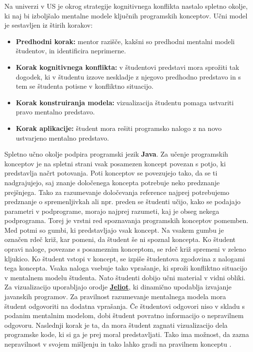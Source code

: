 
Na univerzi v US \cite{mentalModels} je okrog strategije kognitivnega
konflikta nastalo spletno okolje, ki naj bi izboljšalo mentalne modele
ključnih programskih konceptov. Učni model je sestavljen iz štirih
korakov:

\begin{itemize}
\item \textbf{Predhodni korak:} mentor razišče, kakšni so predhodni
 mentalni modeli študentov, in identificira neprimerne.
\item \textbf{Korak kognitivnega konflikta:} v študentovi predstavi
  mora sprožiti tak dogodek, ki v študentu izzove neskladje z njegovo
  predhodno predstavo in s tem se študenta potisne v konfliktno
  situacijo.
\item \textbf{Korak konstruiranja modela:} vizualizacija študentu
  pomaga ustvariti pravo mentalno predstavo.
\item \textbf{Korak aplikacije:} študent mora rešiti programsko
  nalogo z na novo ustvarjeno mentalno predstavo.
\end{itemize}

Spletno učno okolje podpira programski jezik \textbf{Java}. Za učenje
programskih konceptov je na spletni strani vsak posamezen koncept povezan s
potjo, ki predstavlja načrt potovanja. Poti konceptov se povezujejo tako, da se
ti nadgrajujejo, saj znanje določenega koncepta potrebuje neko predznanje
prejšnjega. Tako za razumevanje določevanja reference najprej potrebujemo
predznanje o spremenljivkah ali npr. preden se študenti učijo, kako se podajajo
parametri v podprograme, morajo najprej razumeti, kaj je obseg nekega
podprograma. Torej je vrstni red spoznavanja programskih konceptov pomemben. Med
potmi so gumbi, ki predstavljajo vsak koncept. Na vsakem gumbu je označen rdeč
križ, kar pomeni, da študent še ni spoznal koncepta. Ko študent opravi naloge,
povezane s posameznim konceptom, se rdeč križ spremeni v zeleno kljukico. Ko
študent vstopi v koncept, se izpiše študentova zgodovina z nalogami tega
koncepta. Vsaka naloga vsebuje tako vprašanje, ki sproži konfliktno situacijo v
mentalnem modelu študenta. Nato študenti dobijo učni material v vidni obliki. Za
vizualizacijo uporabljajo orodje
\href{https://cs.joensuu.fi/jeliot/}{\textbf{Jeliot}}, ki dinamično upodablja
izvajanje javanskih programov. Za pravilnost razumevanje mentalnega modela mora
študent odgovoriti na dodatna vprašanja. Če študentovi odgovori niso v skladu s
podanim mentalnim modelom, dobi študent povratno informacijo o nepravilnem
odgovoru. Naslednji korak je ta, da mora študent zagnati vizualizacijo dela
programske kode, ki si ga je prej moral predstavljati. Tako ima možnost, da
zazna nepravilnost v svojem mišljenju in tako lahko gradi na pravilnem konceptu
\cite{mentalModels}.

